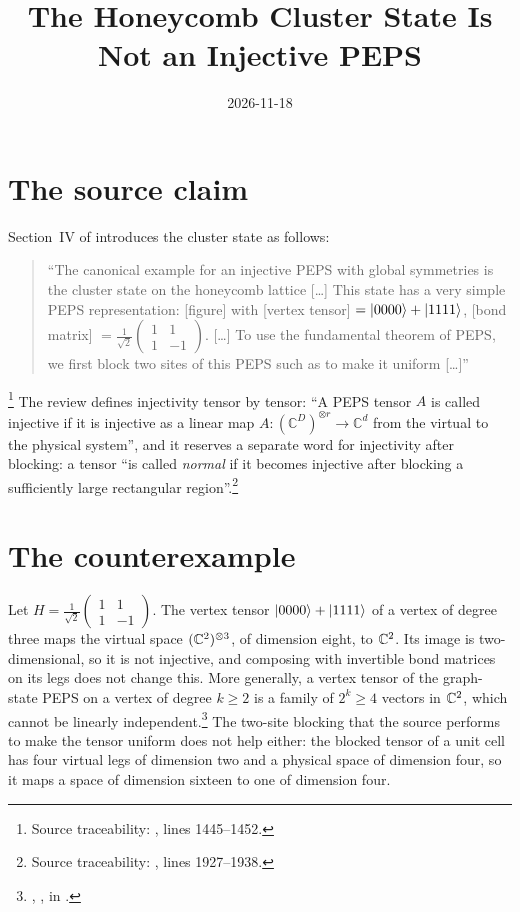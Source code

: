 \documentclass{article}
\title{The Honeycomb Cluster State Is Not an Injective PEPS}
\author{}
\date{2026-11-18}
\begin{document}
\maketitle
{}

\section{The source claim}
Section~IV of \cite{Cirac2021Matrix} introduces the cluster state as follows:
\begin{quote}
    ``The canonical example for an injective PEPS with global symmetries is
    the cluster state on the honeycomb lattice [\ldots] This state has a very
    simple PEPS representation: [figure] with [vertex tensor]
    $=|0000\rangle+|1111\rangle$, [bond matrix]
    $=\frac{1}{\sqrt{2}}\left(\begin{smallmatrix} 1 & 1\\ 1 &
                -1\end{smallmatrix}\right)$.
        [\ldots] To use the fundamental theorem of PEPS, we first block two sites
    of this PEPS such as to make it uniform [\ldots]''
\end{quote}
\footnote{Source traceability: ,
    lines 1445--1452.}
The review defines injectivity tensor by tensor: ``A PEPS tensor $A$ is
called injective if it is injective as a linear map
$A:(\mathbb C^D)^{\otimes r}\to\mathbb C^d$ from the virtual to the physical
system'', and it reserves a separate word for injectivity after blocking: a
tensor ``is called \emph{normal} if it becomes injective after blocking a
sufficiently large rectangular region''.\footnote{Source traceability:
    , lines 1927--1938.}

\section{The counterexample}
Let $H=\frac1{\sqrt2}\left(\begin{smallmatrix}1&1\\1&-1\end{smallmatrix}
    \right)$. The vertex tensor $|0000\rangle+|1111\rangle$ of a vertex of degree
three maps the virtual space $(\mathbb{C}^2)^{\otimes3}$, of dimension eight, to
$\mathbb{C}^2$. Its image is two-dimensional, so it is not injective, and composing
with invertible bond matrices on its legs does not change this. More
generally, a vertex tensor of the graph-state PEPS on a vertex of degree
$k\geq2$ is a family of $2^k\geq4$ vectors in $\mathbb{C}^2$, which cannot be
linearly independent.\footnote{,
    , in
    .}
The two-site blocking that the source performs to make the tensor uniform
does not help either: the blocked tensor of a unit cell has four virtual legs
of dimension two and a physical space of dimension four, so it maps a space of
dimension sixteen to one of dimension four.
\end{document}
